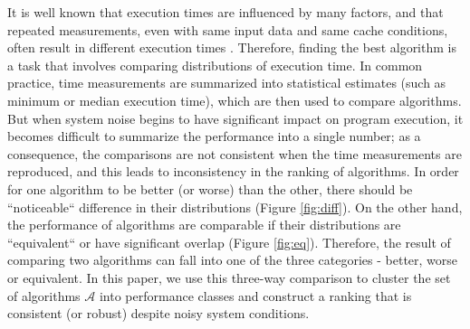 \documentclass[conference]{IEEEtran}
\begin{document}
It is well known that execution times are influenced by many factors, and that repeated measurements, even with same input data and same cache conditions, often result in different execution times\cite{peise2014cache} \cite{hoefler2010characterizing} \cite{peise2012performance}. Therefore, finding the best algorithm is a task that involves comparing distributions of execution time.
%
In common practice, time measurements are summarized into statistical estimates (such as minimum or median execution time), which are then used to compare algorithms\cite{peise2019elaps}. But when system noise begins to have significant impact on program execution, it becomes difficult to summarize the performance into a single number; as a consequence, the comparisons are not consistent when the time measurements are reproduced, and this leads to inconsistency in the ranking of algorithms.
In order for one algorithm to be better (or worse) than the other, there should be ``noticeable`` difference in their distributions (Figure \ref{fig:diff}). On the other hand, the performance of algorithms are comparable if their distributions are ``equivalent`` or have significant overlap (Figure \ref{fig:eq}). 
%
Therefore, the result of comparing two algorithms can fall into one of the three categories - better, worse or equivalent. 
In this paper, we use this three-way comparison to cluster the set of algorithms $\mathcal{A}$ into performance classes and construct a ranking that is consistent (or robust) despite noisy system conditions. 
%
\end{document}
